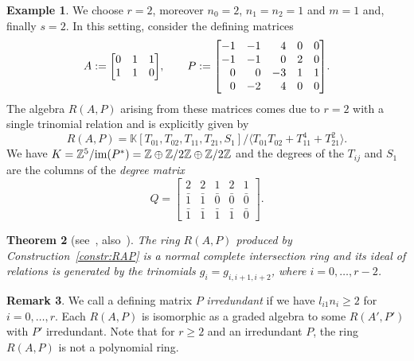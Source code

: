 \documentclass[pdftex]{sigma}%
\newtheorem{thm}{Theorem}[section]
\theoremstyle{definition}
\newtheorem{exam}[thm]{Example}
\newtheorem{rema}[thm]{Remark}
\def\KK{{\mathbb K}}
\def\ZZ{{\mathbb Z}}
\numberwithin{equation}{section}
\begin{document}
\begin{exam}
\label{ex:running-ex-1}
We choose $r = 2$, moreover $n_0 = 2$, $n_1=n_2 = 1$ and
$m=1$ and, finally $s=2$. In this setting, consider
the defining matrices
\[A :=
\begin{bmatrix}
0 & 1 & 1
\\
1 & 1 & 0
\end{bmatrix}\!,
\qquad
P :=\begin{bmatrix}
-1 & -1 & $\phantom{$-$}$4 & 0 & 0
\\
-1 & -1 & $\phantom{$-$}$0 & 2 & 0
\\
$\phantom{$-$}$0 & $\phantom{$-$}$0 & -3 & 1 & 1
\\
$\phantom{$-$}$0 & -2 & $\phantom{$-$}$4 & 0 & 0
\end{bmatrix}\!.
\]
The algebra $R(A,P)$ arising from these matrices
comes due to $r=2$ with a single trinomial
relation and is explicitly given by
\[
R(A,P)
 =
\KK[T_{01},T_{02},T_{11},T_{21},S_1] / \big\langle T_{01}T_{02} + T_{11}^4 + T_{21}^2\big\rangle.
\]
We have
$K = \ZZ^5/{\rm im}(P^*) = \ZZ \oplus \ZZ/2\ZZ \oplus \ZZ / 2\ZZ$
and the degrees of the $T_{ij}$ and $S_1$ are
the columns of the \emph{degree matrix}
\[
Q =\begin{bmatrix}
2 & 2 & 1 & 2 & 1
\\
\bar 1 & \bar 1 & \bar 0 & \bar 0 & \bar 0
\\
\bar 1 & \bar 1 & \bar 1 & \bar 1 & \bar 0
\end{bmatrix}\!.
\]
\end{exam}


\begin{thm}[{see~\cite[Theorem~3.4.2.3]{ArDeHaLa}, also~\cite[Theorems~3.10 and 6.5]{HaHiWr}}]
The ring $R(A,P)$ produced by
Construction~{\rm \ref{constr:RAP}}
is a normal complete intersection ring
and its ideal of relations is generated
by the trinomials $g_i = g_{i,i+1,i+2}$,
where $i = 0, \dots, r-2$.
\end{thm}



\begin{rema}
We call a defining matrix $P$ \emph{irredundant} if we have
$l_{i1}n_i \ge 2$ for $i = 0,\dots, r$.
Each $R(A,P)$ is isomorphic as a graded algebra to
some $R(A',P')$ with $P'$ irredundant.
Note that for $r \ge 2$ and an irredundant $P$,
the ring $R(A,P)$ is not a polynomial ring.
\end{rema}
\end{document}
